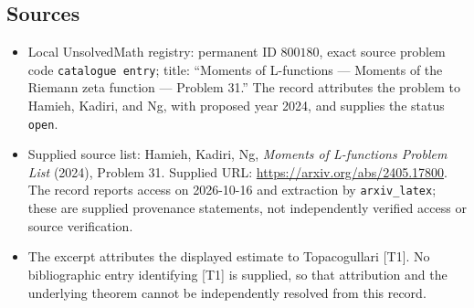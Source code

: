 \documentclass[11pt]{article}
\begin{document}
\subsection{Sources}
\begin{itemize}
\item Local UnsolvedMath registry: permanent ID \(800180\), exact source problem code \texttt{catalogue entry}; title: ``Moments of L-functions --- Moments of the Riemann zeta function --- Problem 31.'' The record attributes the problem to Hamieh, Kadiri, and Ng, with proposed year 2024, and supplies the status \texttt{open}.
\item Supplied source list: Hamieh, Kadiri, Ng, \emph{Moments of L-functions Problem List} (2024), Problem 31. Supplied URL: \url{https://arxiv.org/abs/2405.17800}. The record reports access on 2026-10-16 and extraction by \texttt{arxiv\_latex}; these are supplied provenance statements, not independently verified access or source verification.
\item The excerpt attributes the displayed estimate to Topacogullari [T1]. No bibliographic entry identifying [T1] is supplied, so that attribution and the underlying theorem cannot be independently resolved from this record.
\end{itemize}
\end{document}
